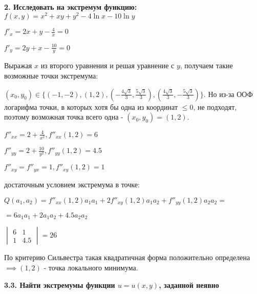 \documentclass{article}
\begin{document}
\noindent \textbf{2. Исследовать на экстремум функцию:\\ $f(x,y)=x^2+xy+y^2-4\ln x - 10 \ln y$}\vspace{2mm}

\noindent$f'_x = 2x + y - \frac{4}{x} = 0$\vspace{1mm}

\noindent$f'_y = 2y + x - \frac{10}{y} = 0$\vspace{1mm}

\noindent Выражая $x$ из второго уравнения и решая уравнение с $y$, получаем такие возможные точки экстремума: \vspace{1mm}

\noindent$(x_0,y_0)\in\{(-1,-2), (1,2), (-\frac{4\sqrt{3}}{3},\frac{5\sqrt{3}}{3}), (\frac{4\sqrt{3}}{3},-\frac{5\sqrt{3}}{3})\}$. Но из-за ООФ логарифма точки, в которых хотя бы одна из координат $\leq 0$, не подходят, поэтому возможная точка всего одна - $(x_0,y_0) = (1,2)$.\vspace{1mm}

\noindent$f''_{xx} = 2 + \frac{4}{x^2}, f''_{xx}(1,2) = 6$\vspace{1mm}

\noindent$f''_{yy} = 2 + \frac{10}{y^2}, f''_{yy} (1,2) = 4.5$\vspace{1mm}

\noindent$f''_{xy} = f''_{yx} = 1, f''_{xy}(1,2) = 1$\vspace{1mm}

 достаточным условием экстремума в точке:\vspace{1mm}

\noindent$Q(a_1,a_2) = f''_{xx}(1,2)a_1a_1 + 2f''_{xy}(1,2)a_1a_2 + f''_{yy}(1,2)a_2a_2 =$\vspace{1mm}

\noindent$= 6a_1a_1 + 2a_1a_2 + 4.5a_2a_2$\vspace{1mm}

\noindent$\begin{vmatrix}
6 & 1 \\ 
1 & 4.5
\end{vmatrix} = 26$\vspace{1mm}

\noindent По критерию Сильвестра такая квадратичная форма положительно определена $\implies (1,2)$ - точка локального минимума.\vspace{3mm}

\noindent \textbf{3.3. Найти экстремумы функции $u = u(x,y)$, заданной неявно}\vspace{2mm}
\end{document}
